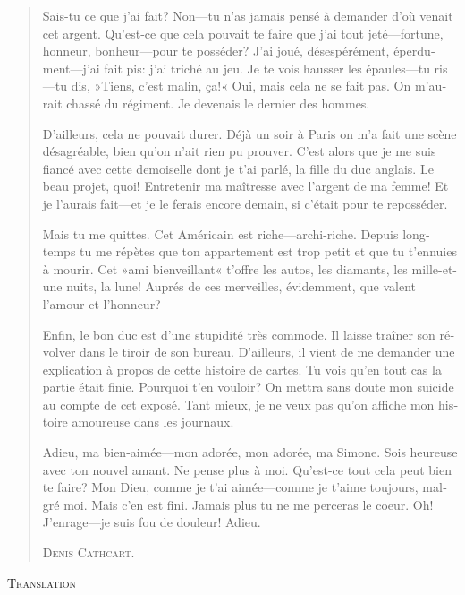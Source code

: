 \begin{quotation}
\begin{french}
Sais-tu ce que j'ai fait? Non—tu n'as jamais pensé à demander d'où
venait cet argent. Qu'est-ce que cela pouvait te faire que j'ai
tout jeté—fortune, honneur, bonheur—pour te posséder? J'ai joué,
désespérément, éperdument—j'ai fait pis: j'ai triché au jeu. Je te
vois hausser les épaules—tu ris—tu dis, »Tiens, c'est malin, ça!«
Oui, mais cela ne se fait pas. On m'aurait chassé du régiment. Je
devenais le dernier des hommes.

D'ailleurs, cela ne pouvait durer. Déjà un soir à Paris on m'a fait
une scène désagréable, bien qu'on n'ait rien pu prouver. C'est alors
que je me suis fiancé avec cette demoiselle dont je t'ai parlé, la
fille du duc anglais. Le beau projet, quoi! Entretenir ma maîtresse
avec l'argent de ma femme! Et je l'aurais fait—et je le ferais encore
demain, si c'était pour te reposséder.

Mais tu me quittes. Cet Américain est riche—archi-riche. Depuis
longtemps tu me répètes que ton appartement est trop petit et que tu
t'ennuies à mourir. Cet »ami bienveillant« t'offre les autos, les
diamants, les mille-et-une nuits, la lune! Auprés de ces merveilles,
évidemment, que valent l'amour et l'honneur?

Enfin, le bon duc est d'une stupidité très commode. Il laisse traîner son révolver dans le tiroir de son bureau. D'ailleurs, il vient de me
demander une explication à propos de cette histoire de cartes. Tu vois
qu'en tout cas la partie était finie. Pourquoi t'en vouloir? On mettra
sans doute mon suicide au compte de cet exposé. Tant mieux, je ne veux
pas qu'on affiche mon histoire amoureuse dans les journaux.

Adieu, ma bien-aimée—mon adorée, mon adorée, ma Simone. Sois
heureuse avec ton nouvel amant. Ne pense plus à moi. Qu'est-ce tout
cela peut bien te faire? Mon Dieu, comme je t'ai aimée—comme je
t'aime toujours, malgré moi. Mais c'en est fini. Jamais plus tu ne me
perceras le coeur. Oh! J'enrage—je suis fou de douleur! Adieu.

\begin{flushright}
\textsc{Denis Cathcart.}
\end{flushright}
\end{french}
\end{quotation}

\textsc{Translation}

